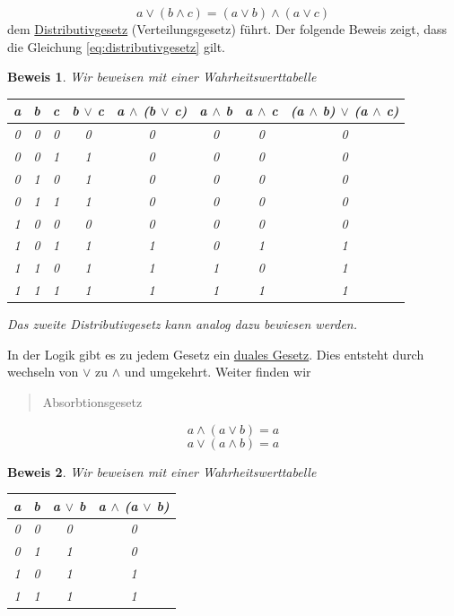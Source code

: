\documentclass{report}
\newtheorem{myproof}{Beweis}
\begin{document}
\begin{equation}a \lor (b \land c) = (a \lor b) \land (a \lor c)\end{equation}
dem \underline{Distributivgesetz} (Verteilungsgesetz) führt. Der folgende Beweis zeigt, dass die Gleichung \ref{eq:distributivgesetz} gilt.
\begin{myproof}Wir beweisen mit einer Wahrheitswerttabelle
\begin{center}\begin{tabular}{c c c | c c c c c}
a & b & c & b \(\lor\) c & a \(\land\) (b \(\lor\) c) & a \(\land\) b & a \(\land\) c & (a \(\land\) b) \(\lor\) (a \(\land\) c)  \\
\hline
0 & 0 & 0 & 0 & 0 & 0 & 0 & 0  \\
0 & 0 & 1 & 1 & 0 & 0 & 0 & 0  \\
0 & 1 & 0 & 1 & 0 & 0 & 0 & 0 \\
0 & 1 & 1 & 1 & 0 & 0 & 0 & 0 \\
1 & 0 & 0 & 0 & 0 & 0 & 0 & 0 \\
1 & 0 & 1 & 1 & 1 & 0 & 1 & 1 \\
1 & 1 & 0 & 1 & 1 & 1 & 0 & 1 \\
1 & 1 & 1 & 1 & 1 & 1 & 1 & 1 \\
\end{tabular}\end{center}
Das zweite Distributivgesetz kann analog dazu bewiesen werden.\end{myproof}
In der Logik gibt es zu jedem Gesetz ein \underline{duales Gesetz}. Dies entsteht durch wechseln von \(\lor\) zu \(\land\) und umgekehrt. Weiter finden wir
\begin{quote}Absorbtionsgesetz\end{quote}
\begin{equation}a \land (a \lor b) = a\end{equation}
\begin{equation}a \lor (a \land b) = a\end{equation}
\begin{myproof}Wir beweisen mit einer Wahrheitswerttabelle
\begin{center}\begin{tabular}{c c | c c}
a & b & a \(\lor\) b & a \(\land\) (a \(\lor\) b) \\
\hline
0 & 0 & 0 & 0  \\
0 & 1 & 1 & 0  \\
1 & 0 & 1 & 1  \\
1 & 1 & 1 & 1 \\
\end{tabular}\end{center}\end{myproof}
\end{document}

